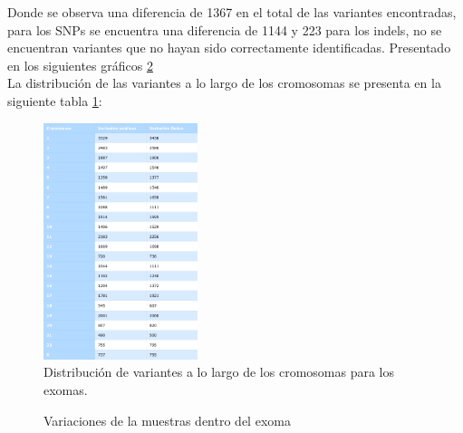 Donde se observa una diferencia de 1367 en el total de las variantes encontradas, para los SNPs se encuentra una diferencia de 1144 y 223 para los indels, no se encuentran variantes que no hayan sido correctamente identificadas. Presentado en los siguientes gráficos \ref{f:histogramas2} \\

La distribución de las variantes a lo largo de los cromosomas se presenta en la siguiente tabla \ref{fig:tabla2}:

\begin{figure}[H]
	\centering
	\includegraphics[width=0.4\textwidth]{Kap2/latex_table2}
	\caption{Distribución de variantes a lo largo de los cromosomas para los exomas.} \label{fig:tabla2}
\end{figure}

\begin{figure}[H]
	\centering
	\caption{Variaciones de la muestras dentro del exoma}
	\label{f:histogramas2}
\end{figure}

